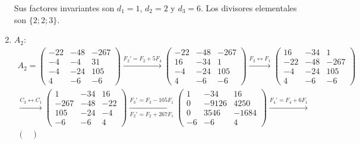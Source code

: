\begin{ejercicio}
\begin{enumerate}
        Sus factores invariantes son $d_1=1$, $d_2=2$ y $d_3=6$.
        Los divisores elementales son $\{ 2; 2; 3\}$.

        \item $A_2$:
        \begin{multline*}
            A_2 = \begin{pmatrix}
                -22 & -48 & -267 \\
                -4 & -4 & 31 \\
                -4 & -24 & 105 \\
                4 & -6 & -6
            \end{pmatrix}
            \xrightarrow{F_2'=F_2+5F_4}
            \begin{pmatrix}
                -22 & -48 & -267 \\
                16 & -34 & 1 \\
                -4 & -24 & 105 \\
                4 & -6 & -6
            \end{pmatrix}
            \xrightarrow{F_2\leftrightarrow F_1}
            \begin{pmatrix}
                16 & -34 & 1 \\
                -22 & -48 & -267 \\
                -4 & -24 & 105 \\
                4 & -6 & -6
            \end{pmatrix}\\
            \xrightarrow{C_3\leftrightarrow C_1}
            \begin{pmatrix}
                1 & -34 & 16 \\
                -267 & -48 & -22 \\
                105 & -24 & -4 \\
                -6 & -6 & 4
            \end{pmatrix}
            \xrightarrow[F_2'=F_2+267F_1]{F_3'=F_3-105F_1}
            \begin{pmatrix}
                1 & -34 & 16 \\
                0 & -9126 & 4250 \\
                0 & 3546 & -1684 \\
                -6 & -6 & 4
            \end{pmatrix}
            \xrightarrow{F_4'=F_4+6F_1}\\
            \begin{pmatrix}

\end{pmatrix}
\end{multline*}
\end{enumerate}
\end{ejercicio}
